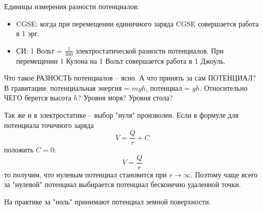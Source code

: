 \documentclass[12pt,epsfig,color,russian]{article}
\begin{document}
Единицы измерения разности потенциалов:
\begin{itemize}
\item CGSE: когда при перемещении единичного заряда CGSE совершается работа в 1 эрг.
\item СИ: 1 Вольт = $\frac1{300}$ электростатической разности потенциалов. При пе\-ре\-ме\-ще\-нии 1 Кулона на 1 Вольт совершается работа в 1 Джоуль.
\end{itemize}

Что такое РАЗНОСТЬ потенциалов -- ясно. А что принять за сам ПО\-ТЕН\-ЦИАЛ?  В гравитации: потенциальная энергия = $mgh$,  потенциал = $gh$. Относительно ЧЕГО берется высота $h$? Уровня моря? Уровня стола?

Так же и в электростатике -- выбор "нуля" произволен. Если в формуле для потенциала точечного заряда
\begin{displaymath}
V=\frac Qr+C
\end{displaymath}
положить $C=0$:
\begin{displaymath}
V=\frac Qr
\end{displaymath}
то получим, что нулевым  потенциал становится при $r\rightarrow\infty$. Поэтому чаще всего за "нулевой" потенциал выбирается потенциал бесконечно удаленной точки.
 \begin{center}
 \end{center}

На практике за "ноль" принимают потенциал земной поверхности.
\newpage
\end{document}
